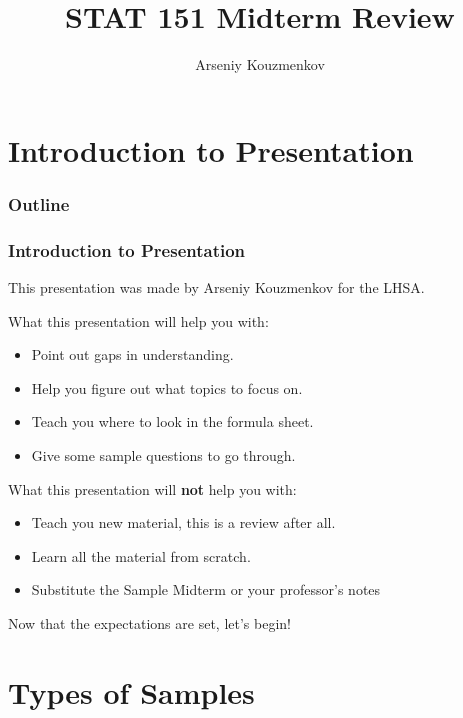 \documentclass{beamer}
\title{STAT 151 Midterm Review}
\author{Arseniy Kouzmenkov}
\institute{University of Alberta}
\begin{document}
    \begin{frame}
        \titlepage
    \end{frame}

     \section{Introduction to Presentation}
    
    \begin{frame}
        \frametitle{Outline}
        \tableofcontents
    \end{frame}

    \begin{frame}
        \frametitle{Introduction to Presentation}
        This presentation was made by Arseniy Kouzmenkov for the LHSA.\newline \pause

        What this presentation will help you with: 
        \begin{itemize}
            \item Point out gaps in understanding. \pause
            \item Help you figure out what topics to focus on. \pause
            \item Teach you where to look in the formula sheet. \pause
            \item Give some sample questions to go through. \pause
        \end{itemize}

        What this presentation will \textbf{not} help you with:
        \begin{itemize}
            \item Teach you new material, this is a review after all. \pause
            \item Learn all the material from scratch. \pause
            \item Substitute the Sample Midterm or your professor's notes \pause
        \end{itemize}

        Now that the expectations are set, let's begin!         
    \end{frame}

    \section{Types of Samples}
\end{document}
